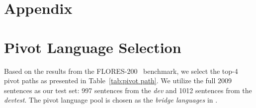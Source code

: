 \section*{Appendix}
\appendix


\section{Pivot Language Selection}
\label{sec:apdx_top4 pivot langauges}

Based on the results from the FLORES-200~\cite{nllb} benchmark, we select the top-4 pivot paths as presented in Table~\ref{tab:pivot path}.
We utilize the full 2009 sentences as our test set: 997 sentences from the \textit{dev} and 1012 sentences from the \textit{devtest}.
The pivot language pool is chosen as the \textit{bridge languages} in \citet{m2m100}.


